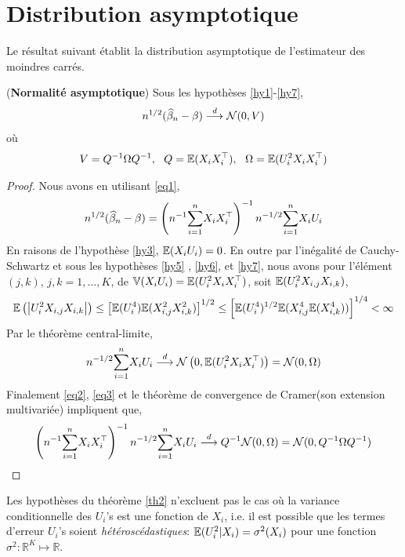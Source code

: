 \documentclass[12pt, reqno]{amsart}
\begin{document}
\section{Distribution asymptotique}
Le résultat suivant établit la distribution asymptotique de l'estimateur des moindres carrés.
\begin{theoreme}\label{th2}(\textbf{Normalité asymptotique})
Sous les hypothèses \ref{hy1}-\ref{hy7},
\begin{align*}
n^{1/2}(\widehat{\beta}_n - \beta) \overset{d}{\longrightarrow} \mathcal{N}(0, V)
\end{align*}
où
\begin{align*}
V = Q^{-1} \Omega Q^{-1}, \ \ Q = \mathbb{E}(X_iX_i^\top), \ \ \Omega =  \mathbb{E}(U_i^2X_iX_i^\top)
\end{align*}
\end{theoreme}
\begin{proof}
Nous avons en utilisant \eqref{eq1},
\begin{align*}
n^{1/2}(\widehat{\beta}_n - \beta) = \left(n^{-1}\underset{i=1}{\overset{n}{\sum}} X_iX_i^\top\right)^{-1}n^{-1/2}\underset{i=1}{\overset{n}{\sum}} X_iU_i 
\end{align*}
En raisons de l'hypothèse \ref{hy3}, $\mathbb{E}(X_iU_i) = 0$. En outre par l'inégalité de Cauchy-Schwartz et sous les hypothèses \ref{hy5} , \ref{hy6},  et \ref{hy7}, nous avons pour l'élément  $(j, k)$, $j,k = 1,...,K$, de $\mathbb{V}(X_iU_i) = \mathbb{E}(U_i^2X_iX_i^\top)$, soit $\mathbb{E}(U_i^2X_{i,j}X_{i,k})$,
\begin{align*}
\mathbb{E}\left(\left\vert {U_i^2 X_{i,j}  X_{i,k}} \right\vert\right) \leq \left[\mathbb{E}(U_i^4)\mathbb{E}(X_{i,j}^2X_{i,k}^2)\right]^{1/2} \leq  \left[\mathbb{E}(U_i^4)^{1/2}
\mathbb{E}(X_ {i,j}^4\mathbb{E}(X_{i,k}^4))\right]^{1/4} < \infty 
\end{align*}
Par le théorème central-limite,
\begin{align}
n^{-1/2}\underset{i=1}{\overset{n}{\sum}} X_iU_i  \overset{d}{\longrightarrow} \mathcal{N}\left(0, \mathbb{E}(U_i^2X_iX_i^\top)\right) = \mathcal{N}(0, \Omega)
\label{eq3}
\end{align}
Finalement \eqref{eq2}, \eqref{eq3} et le théorème de convergence de Cramer(son extension multivariée) impliquent que,
\begin{align*}
\left(n^{-1}\underset{i=1}{\overset{n}{\sum}} X_iX_i^\top\right)^{-1}n^{-1/2}\underset{i=1}{\overset{n}{\sum}} X_iU_i \overset{d}{\longrightarrow} Q^{-1} \mathcal{N}(0, \Omega) = \mathcal{N}(0, Q^{-1}\Omega Q^{-1})
\end{align*}
\end{proof}
\begin{remarque}\label{re1}
Les hypothèses du théorème \ref{th2} n'excluent pas le cas où la variance conditionnelle des $U_i$'s est une fonction de $X_i$, i.e. il est possible que les termes d'erreur $U_i$'s soient \emph{hétéroscédastiques}: $\mathbb{E}(U_i^2|X_i) = \sigma^2(X_i)$ pour une fonction $\sigma^2: \mathbb{R}^K \mapsto \mathbb{R}$.
\end{remarque}
\end{document}
